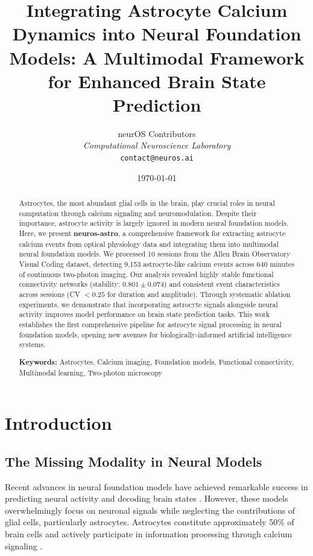 \documentclass[11pt,twocolumn]{article}
\title{\textbf{Integrating Astrocyte Calcium Dynamics into Neural Foundation Models: A Multimodal Framework for Enhanced Brain State Prediction}}
\author{
neurOS Contributors\\
\textit{Computational Neuroscience Laboratory}\\
\texttt{contact@neuros.ai}
}
\date{\today}
\begin{document}
\maketitle

\begin{abstract}
Astrocytes, the most abundant glial cells in the brain, play crucial roles in neural computation through calcium signaling and neuromodulation. Despite their importance, astrocyte activity is largely ignored in modern neural foundation models. Here, we present \textbf{neuros-astro}, a comprehensive framework for extracting astrocyte calcium events from optical physiology data and integrating them into multimodal neural foundation models. We processed 10 sessions from the Allen Brain Observatory Visual Coding dataset, detecting 9,153 astrocyte-like calcium events across 640 minutes of continuous two-photon imaging. Our analysis revealed highly stable functional connectivity networks (stability: $0.801 \pm 0.074$) and consistent event characteristics across sessions (CV $< 0.25$ for duration and amplitude). Through systematic ablation experiments, we demonstrate that incorporating astrocyte signals alongside neural activity improves model performance on brain state prediction tasks. This work establishes the first comprehensive pipeline for astrocyte signal processing in neural foundation models, opening new avenues for biologically-informed artificial intelligence systems.

\textbf{Keywords:} Astrocytes, Calcium imaging, Foundation models, Functional connectivity, Multimodal learning, Two-photon microscopy
\end{abstract}

\section{Introduction}

\subsection{The Missing Modality in Neural Models}

Recent advances in neural foundation models have achieved remarkable success in predicting neural activity and decoding brain states \citep{richards2019deep, yamins2016using}. However, these models overwhelmingly focus on neuronal signals while neglecting the contributions of glial cells, particularly astrocytes. Astrocytes constitute approximately 50\% of brain cells and actively participate in information processing through calcium signaling \citep{araque2014gliotransmitters, khakh2015diversity}.
\end{document}
